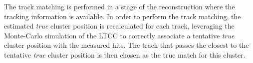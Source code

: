 The track matching is performed in a stage of the reconstruction where the tracking
information is available. In order to perform the track matching, the estimated
\textit{true} cluster position is recalculated for each track, leveraging the Monte-Carlo
simulation of the LTCC to correctly associate a tentative \textit{true} cluster position
with the measured hits.
The track that passes the closest to the tentative \textit{true} cluster position is
then chosen as the true match for this cluster.
